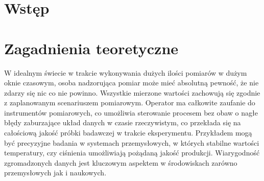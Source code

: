 \documentclass[a4paper,twoside,12pt]{book}
\newcounter{stronyPozaNumeracja}
\begin{document}
	
	
	
	\tableofcontents
	
	\setcounter{stronyPozaNumeracja}{\value{page}}
	\mainmatter
	\pagestyle{empty}
	
	\cleardoublepage
	
	\pagestyle{NumeryStronNazwyRozdzialow}
	
	
	\chapter{Wstęp}
	
	
	
	
	\chapter{Zagadnienia teoretyczne}
	W idealnym świecie w trakcie wykonywania dużych ilości pomiarów w dużym oknie czasowym, osoba nadzorująca pomiar może mieć absolutną pewność, że nie zdarzy się nic co nie powinno. Wszystkie mierzone wartości zachowują się zgodnie z zaplanowanym scenariuszem pomiarowym. Operator ma całkowite zaufanie do instrumentów pomiarowych, co umożliwia sterowanie procesem bez obaw o nagłe błędy zaburzające układ danych w czasie rzeczywistym, co przekłada się na całościową jakość próbki badawczej w trakcie eksperymentu. Przykładem mogą być precyzyjne badania w systemach przemysłowych, w których stabilne wartości temperatury, czy ciśnienia umożliwiają pożądaną jakość produkcji. Wiarygodność zgromadzonych danych jest kluczowym aspektem w środowiskach zarówno przemysłowych jak i naukowych. 
	
\end{document}
